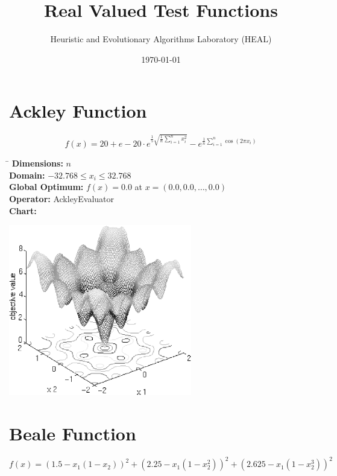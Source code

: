 \documentclass[12pt, a4paper]{article}
\title{Real Valued Test Functions}
\author{Heuristic and Evolutionary Algorithms Laboratory (HEAL)}
\date{\today}
\begin{document}
	\maketitle

	\section*{Ackley Function}
		\begin{equation*}
			f(x) = 20 + e - 20 \cdot e^{\frac{1}{5} \sqrt{\frac{1}{n} \sum_{i=1}^n x_i^2}} - e^{\frac{1}{n} \sum_{i=1}^n \cos(2 \pi x_i)}
		\end{equation*}

		\begin{tabbing}
			\hspace{5cm}\=\kill
			\textbf{Dimensions:}     \> $n$ \\
			\textbf{Domain:}         \> $-32.768 \leq x_i \leq 32.768$ \\
			\textbf{Global Optimum:} \> $f(x) = 0.0$ at $x = (0.0, 0.0, \dots, 0.0)$ \\
			\textbf{Operator:}       \> AckleyEvaluator \\
			\textbf{Chart:}          \> \\
		\end{tabbing}

		\begin{center}
			\includegraphics[width=0.6\textwidth]{Images/Ackley}
		\end{center}

	\section*{Beale Function}
		\begin{equation*}
			f(x) = (1.5 - x_1 (1 - x_2))^2 + (2.25 - x_1 (1 - x_2^2))^2 + (2.625 - x_1 (1 - x_2^3))^2
		\end{equation*}
\end{document}
